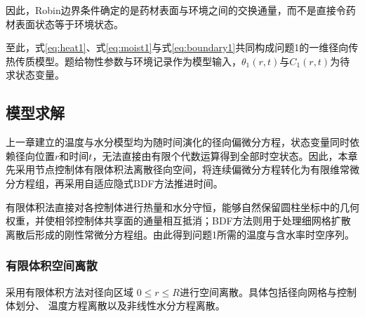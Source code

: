 \documentclass[withoutpreface]{cumcmthesis}
\begin{document}
因此，Robin边界条件确定的是药材表面与环境之间的交换通量，而不是直接令药材表面状态等于环境状态。

至此，式\eqref{eq:heat1}、式\eqref{eq:moist1}与式\eqref{eq:boundary1}共同构成问题1的一维径向传热传质模型。题给物性参数与环境记录作为模型输入，$\theta_1(r,t)$与$C_1(r,t)$为待求状态变量。


\subsection{模型求解}\label{sec:q1solve}

上一章建立的温度与水分模型均为随时间演化的径向偏微分方程，状态变量同时依赖径向位置$r$和时间$t$，无法直接由有限个代数运算得到全部时空状态。因此，本章先采用节点控制体有限体积法离散径向空间，将连续偏微分方程转化为有限维常微分方程组，再采用自适应隐式BDF方法推进时间。

有限体积法直接对各控制体进行热量和水分守恒，能够自然保留圆柱坐标中的几何权重，并使相邻控制体共享面的通量相互抵消；BDF方法则用于处理细网格扩散离散后形成的刚性常微分方程组。由此得到问题1所需的温度与含水率时空序列。

\subsubsection{有限体积空间离散}

采用有限体积方法\citep{Guyer2009}对径向区域
$0\le r\le R$进行空间离散。具体包括径向网格与控制体划分、
温度方程离散以及非线性水分方程离散。
\end{document}
